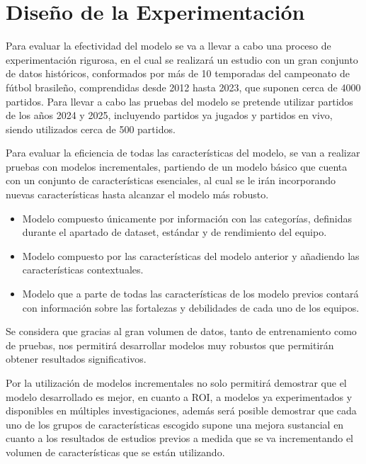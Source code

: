 \section{Diseño de la Experimentación}

Para evaluar la efectividad del modelo se va a llevar a cabo una proceso de experimentación rigurosa, en el cual se realizará un estudio con un gran conjunto de datos históricos, conformados por más de 10 temporadas del campeonato de fútbol brasileño, comprendidas desde 2012 hasta 2023, que suponen cerca de 4000 partidos. Para llevar a cabo las pruebas del modelo se pretende utilizar partidos de los años 2024 y 2025, incluyendo partidos ya jugados y partidos en vivo, siendo utilizados cerca de 500 partidos. 

Para evaluar la eficiencia de todas las características del modelo, se van a realizar pruebas con modelos incrementales, partiendo de un modelo básico que cuenta con un conjunto de características esenciales, al cual se le irán incorporando nuevas características hasta alcanzar el modelo más robusto.

\begin{itemize}
    \item Modelo compuesto únicamente por información con las categorías, definidas durante el apartado de dataset, estándar y de rendimiento del equipo.
    \item Modelo compuesto por las características del modelo anterior y añadiendo las características contextuales.
    \item Modelo que a parte de todas las características de los modelo previos contará con información sobre las fortalezas y debilidades de cada uno de los equipos.
\end{itemize}

Se considera que gracias al gran volumen de datos, tanto de entrenamiento como de pruebas, nos permitirá desarrollar modelos muy robustos que permitirán obtener resultados significativos. 

Por la utilización de modelos incrementales no solo permitirá demostrar que el modelo desarrollado es mejor, en cuanto a ROI, a modelos ya experimentados y disponibles en múltiples investigaciones, además será posible demostrar que cada uno de los grupos de características escogido supone una mejora sustancial en cuanto a los resultados de estudios previos a medida que se va incrementando el volumen de características que se están utilizando.